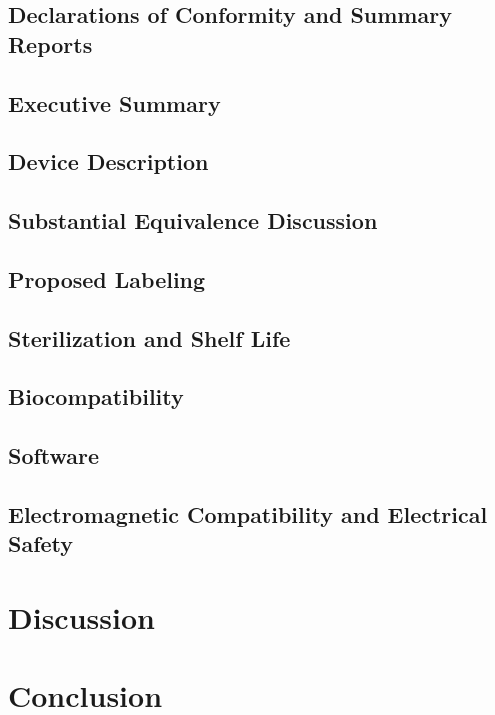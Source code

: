 \documentclass{article}
\begin{document}
\subsection{Declarations of Conformity and Summary Reports}
\subsection{Executive Summary}
\subsection{Device Description}
\subsection{Substantial Equivalence Discussion}
\subsection{Proposed Labeling}
\subsection{Sterilization and Shelf Life}
\subsection{Biocompatibility}
\subsection{Software}
\subsection{Electromagnetic Compatibility and Electrical Safety}

\section{Discussion}
\label{sec:discussion}

\section{Conclusion}
\label{sec:conclusion}


\newpage
{}


\end{document}

